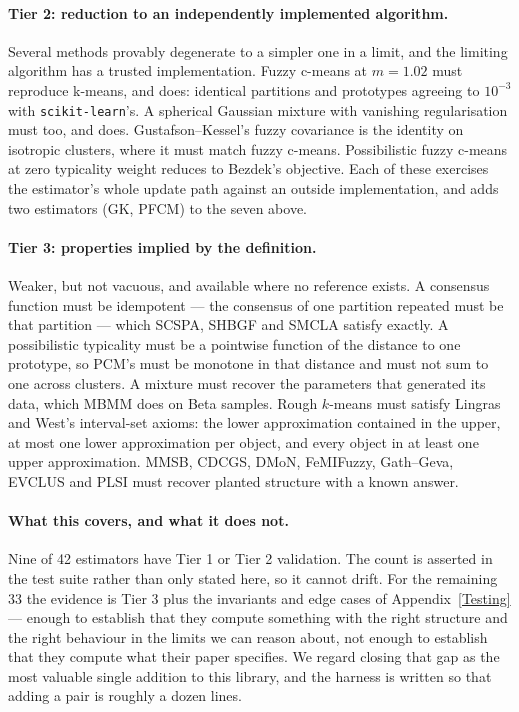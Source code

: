 \documentclass[twoside,11pt]{article}
\begin{document}
\paragraph{Tier 2: reduction to an independently implemented algorithm.}
Several methods provably degenerate to a simpler one in a limit, and the
limiting algorithm has a trusted implementation. Fuzzy c-means at $m = 1.02$
must reproduce k-means, and does: identical partitions and prototypes
agreeing to $10^{-3}$ with \texttt{scikit-learn}'s. A spherical Gaussian
mixture with vanishing regularisation must too, and does. Gustafson--Kessel's
fuzzy covariance is the identity on isotropic clusters, where it must match
fuzzy c-means. Possibilistic fuzzy c-means at zero typicality weight reduces
to Bezdek's objective. Each of these exercises the estimator's whole update
path against an outside implementation, and adds two estimators (GK, PFCM) to
the seven above.

\paragraph{Tier 3: properties implied by the definition.}
Weaker, but not vacuous, and available where no reference exists. A consensus
function must be idempotent --- the consensus of one partition repeated must
be that partition --- which SCSPA, SHBGF and SMCLA satisfy exactly. A
possibilistic typicality must be a pointwise function of the distance to one
prototype, so PCM's must be monotone in that distance and must not sum to one
across clusters. A mixture must recover the parameters that generated its
data, which MBMM does on Beta samples. Rough $k$-means must satisfy Lingras
and West's interval-set axioms: the lower approximation contained in the
upper, at most one lower approximation per object, and every object in at
least one upper approximation. MMSB, CDCGS, DMoN, FeMIFuzzy, Gath--Geva,
EVCLUS and PLSI must recover planted structure with a known answer.

\paragraph{What this covers, and what it does not.}
Nine of 42 estimators have Tier 1 or Tier 2 validation. The count is asserted
in the test suite rather than only stated here, so it cannot drift. For the
remaining 33 the evidence is Tier 3 plus the invariants and edge cases of
Appendix~\ref{Testing} --- enough to establish that they compute something
with the right structure and the right behaviour in the limits we can reason
about, not enough to establish that they compute what their paper specifies.
We regard closing that gap as the most valuable single addition to this
library, and the harness is written so that adding a pair is roughly a dozen
lines.
\end{document}

